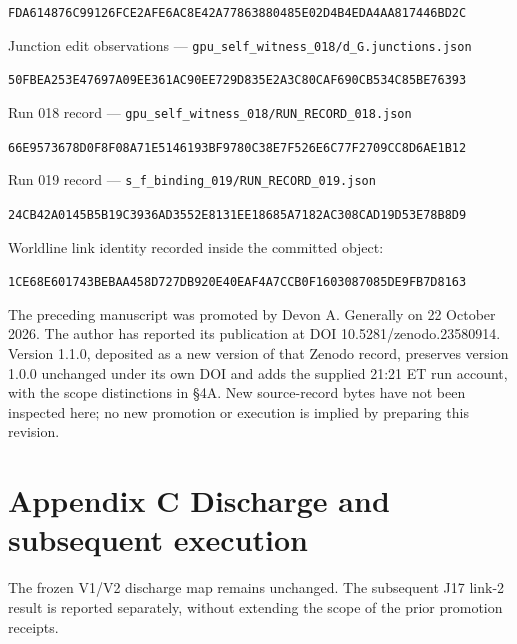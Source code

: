 \documentclass[
]{article}
\begin{document}
\nolinkurl{FDA614876C99126FCE2AFE6AC8E42A77863880485E02D4B4EDA4AA817446BD2C}

Junction edit observations ---
\nolinkurl{gpu_self_witness_018/d_G.junctions.json}

\nolinkurl{50FBEA253E47697A09EE361AC90EE729D835E2A3C80CAF690CB534C85BE76393}

Run 018 record --- \nolinkurl{gpu_self_witness_018/RUN_RECORD_018.json}

\nolinkurl{66E9573678D0F8F08A71E5146193BF9780C38E7F526E6C77F2709CC8D6AE1B12}

Run 019 record --- \nolinkurl{s_f_binding_019/RUN_RECORD_019.json}

\nolinkurl{24CB42A0145B5B19C3936AD3552E8131EE18685A7182AC308CAD19D53E78B8D9}

Worldline link identity recorded inside the committed object:

\nolinkurl{1CE68E601743BEBAA458D727DB920E40EAF4A7CCB0F1603087085DE9FB7D8163}

The preceding manuscript was promoted by Devon A. Generally on 22
October 2026. The author has reported its publication at DOI
10.5281/zenodo.23580914. Version 1.1.0, deposited as a new version of
that Zenodo record, preserves version 1.0.0 unchanged under its own DOI
and adds the supplied 21:21 ET run account, with the scope distinctions
in §4A. New source-record bytes have not been inspected here; no new
promotion or execution is implied by preparing this revision.

\section{Appendix C Discharge and subsequent
execution}\label{appendix-c-discharge-and-subsequent-execution}

The frozen V1/V2 discharge map remains unchanged. The subsequent J17
link-2 result is reported separately, without extending the scope of the
prior promotion receipts.
\end{document}
